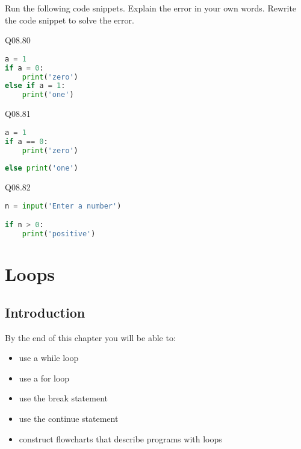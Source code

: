 \documentclass{book}
\begin{document}
Run the following code snippets. Explain the error in your own words.
Rewrite the code snippet to solve the error.
    




    
        Q08.80

\begin{lstlisting}[language=Python]
a = 1
if a = 0:
    print('zero')
else if a = 1:
    print('one')
\end{lstlisting}
    




    
        Q08.81

\begin{lstlisting}[language=Python]
a = 1
if a == 0:
    print('zero')
    
else print('one')
\end{lstlisting}
    




    
        Q08.82

\begin{lstlisting}[language=Python]
n = input('Enter a number')

if n > 0:
    print('positive')
\end{lstlisting}
    




    
        \hypertarget{loops}{%
\chapter{Loops}\label{loops}}
    




    
        \hypertarget{introduction}{%
\section{Introduction}\label{introduction}}
    




    
        By the end of this chapter you will be able to:

\begin{itemize}
\item
  use a while loop
\item
  use a for loop
\item
  use the break statement
\item
  use the continue statement
\item
  construct flowcharts that describe programs with loops
\end{itemize}
        \newpage
\end{document}
